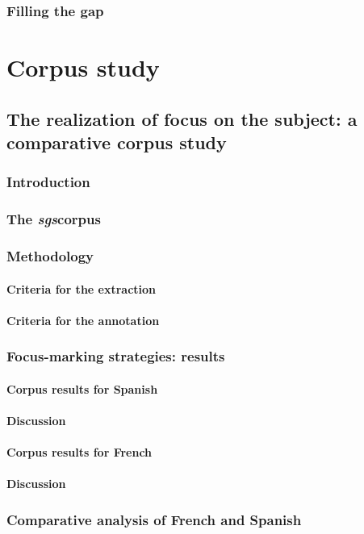 \documentclass[12pt]{report}
\begin{document}
\section{Filling the gap}
\part{Corpus study}
\chapter{The realization of focus on the subject: a comparative corpus study}
\section{Introduction}
\section{The \textit{sgs}corpus}
\section{Methodology}
\subsection{Criteria for the extraction}
\subsection{Criteria for the annotation}
\section{Focus-marking strategies: results}
\subsection{Corpus results for Spanish}
\subsection{Discussion}
\subsection{Corpus results for French}
\subsection{Discussion}
\section{Comparative analysis of French and Spanish}
\end{document}
